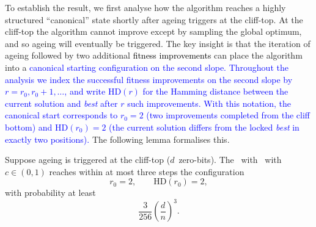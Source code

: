 To establish the result, we first analyse how the algorithm reaches a highly 
structured ``canonical'' state shortly after ageing triggers at the cliff-top.
At the cliff-top the algorithm cannot improve except by sampling the global 
optimum, and so ageing will eventually be triggered.  The key insight is that 
the iteration of ageing followed by two additional \textcolor{black}{fitness improvements} can place the 
algorithm into a
\textcolor{blue}{canonical
starting configuration on the second slope.
Throughout the \cliff{} analysis we index the successful fitness improvements on
the second slope by $r = r_0, r_0+1, \dots$, and write $\mathrm{HD}(r)$ for
the Hamming distance between the current solution and \emph{best} after $r$
such improvements.
With this notation, the canonical start corresponds to
$r_0 = 2$ (two improvements completed from the cliff bottom)
and $\mathrm{HD}(r_0) = 2$ (the current solution differs from the locked
\emph{best} in exactly two positions).}  The following lemma formalises this.

\begin{lemma}%
	\label{lem:can-start-omega-d3}
	Suppose ageing is triggered at the cliff-top ($d$~zero-bits).  
	The \rev{\firstBest}~with \linHD\ with $c\in(0,1)$ reaches within at most three steps the 
	configuration
	\[
	r_0=2, \qquad \mathrm{HD}(r_0)=2,
	\]
	with probability at least 
	\[
	\frac{3}{256}\left(\frac{d}{n}\right)^3.
	\]
\end{lemma}


